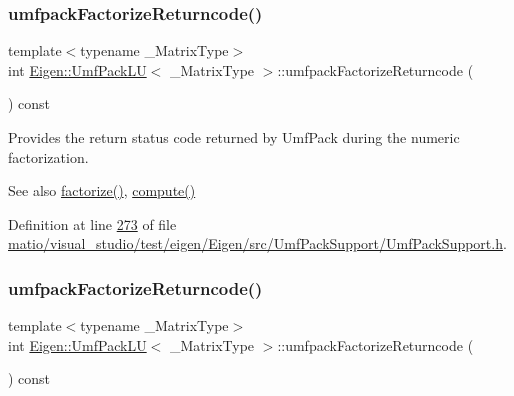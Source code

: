 \subsubsection{\texorpdfstring{umfpack\+Factorize\+Returncode()}{umfpackFactorizeReturncode()}\hspace{0.1cm}{\footnotesize\ttfamily [1/2]}}
{\footnotesize\ttfamily template$<$typename \+\_\+\+Matrix\+Type$>$ \\
int \hyperlink{class_eigen_1_1_umf_pack_l_u}{Eigen\+::\+Umf\+Pack\+LU}$<$ \+\_\+\+Matrix\+Type $>$\+::umfpack\+Factorize\+Returncode (\begin{DoxyParamCaption}{ }\end{DoxyParamCaption}) const\hspace{0.3cm}{\ttfamily [inline]}}

Provides the return status code returned by Umf\+Pack during the numeric factorization.

\begin{DoxySeeAlso}{See also}
\hyperlink{class_eigen_1_1_umf_pack_l_u_a1471bf890503e743c45d75cc02a5345d}{factorize()}, \hyperlink{class_eigen_1_1_umf_pack_l_u_a05fb2b5717ebd67e46b83439721ceee7}{compute()} 
\end{DoxySeeAlso}


Definition at line \hyperlink{matio_2visual__studio_2test_2eigen_2_eigen_2src_2_umf_pack_support_2_umf_pack_support_8h_source_l00273}{273} of file \hyperlink{matio_2visual__studio_2test_2eigen_2_eigen_2src_2_umf_pack_support_2_umf_pack_support_8h_source}{matio/visual\+\_\+studio/test/eigen/\+Eigen/src/\+Umf\+Pack\+Support/\+Umf\+Pack\+Support.\+h}.

\mbox{\label{class_eigen_1_1_umf_pack_l_u_a822fa9d82754269c379dc4ce17920b0a}} 
\subsubsection{\texorpdfstring{umfpack\+Factorize\+Returncode()}{umfpackFactorizeReturncode()}\hspace{0.1cm}{\footnotesize\ttfamily [2/2]}}
{\footnotesize\ttfamily template$<$typename \+\_\+\+Matrix\+Type$>$ \\
int \hyperlink{class_eigen_1_1_umf_pack_l_u}{Eigen\+::\+Umf\+Pack\+LU}$<$ \+\_\+\+Matrix\+Type $>$\+::umfpack\+Factorize\+Returncode (\begin{DoxyParamCaption}{ }\end{DoxyParamCaption}) const\hspace{0.3cm}{\ttfamily [inline]}}

